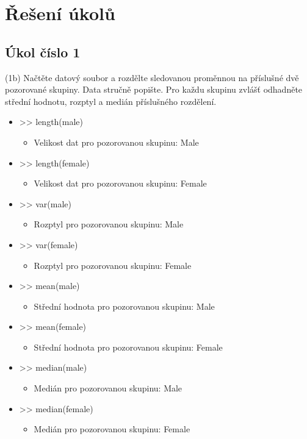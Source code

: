 \documentclass[paper=a4, fontsize=12pt]{scrartcl}
\numberwithin{equation}{section}		%
\numberwithin{figure}{section}			%
\numberwithin{table}{section}				%
\begin{document}
\section{Řešení úkolů}
\subsection{Úkol číslo 1}
(1b) Načtěte datový soubor a rozdělte sledovanou proměnnou na příslušné dvě pozorované skupiny. Data stručně popište. 
Pro každu skupinu zvlášť odhadněte střední hodnotu, rozptyl a medián příslušného rozdělení.

\begin{itemize}
	\item >> length(male)
		\begin{itemize}
		\item Velikost dat pro pozorovanou skupinu: Male
		\end{itemize}
	\item >> length(female)
		\begin{itemize}
		\item Velikost dat pro pozorovanou skupinu: Female
		\end{itemize}
	\item >> var(male)
		\begin{itemize}
		\item Rozptyl pro pozorovanou skupinu: Male
		\end{itemize}
	\item >> var(female)
		\begin{itemize}
		\item Rozptyl pro pozorovanou skupinu: Female
		\end{itemize}
	\item >> mean(male)
		\begin{itemize}
		\item Střední hodnota pro pozorovanou skupinu: Male
		\end{itemize}
	\item >> mean(female)
		\begin{itemize}
		\item Střední hodnota pro pozorovanou skupinu: Female
		\end{itemize}
	\item >> median(male)
		\begin{itemize}
		\item Medián pro pozorovanou skupinu: Male
		\end{itemize}
	\item >> median(female)
		\begin{itemize}
		\item Medián pro pozorovanou skupinu: Female
		\end{itemize}
\end{itemize}
\end{document}
